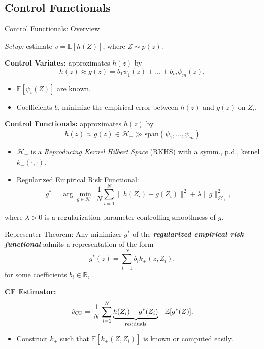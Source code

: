 \documentclass[9pt]{beamer}
\begin{document}
\subsection{Control Functionals}

\begin{frame}[fragile]{Control Functionals: Overview}
\small

\textit{Setup:} estimate $v = \mathbb{E}[h(Z)]$, where $Z \sim p(z)$.

\textbf{Control Variates:} approximates $h(z)$ by
\[
h(z) \approx g(z) = b_1 \psi_1(z) + \dots + b_m \psi_m(z),
\]

\begin{itemize}
\item $\mathbb{E}[\psi_i(Z)]$ are known.
\item Coefficients $b_i$ minimize the empirical error between $h(z)$ and $g(z)$ on $Z_i$.
\end{itemize}

\textbf{Control Functionals\cite{cf}:} approximates $h(z)$ by
$$h(z) \approx g(z) \in \mathcal{H}_+ \gg \text{span}(\psi_1, ..., \psi_m)$$

\begin{itemize}
    \item $\mathcal{H}_+$ is a \emph{Reproducing Kernel Hilbert Space} (RKHS) with a symm., p.d., kernel $k_+(\cdot, \cdot)$.
    \item Regularized Empirical Risk Functional:
    \[
    g^* = \arg \min_{g \in \mathcal{H}_+} \frac{1}{N} \sum_{i=1}^N \|h(Z_i) - g(Z_i)\|^2 + \lambda \|g\|_{\mathcal{H}_+}^2,
    \]
\end{itemize}

where $\lambda > 0$ is a regularization parameter controlling smoothness of $g$.

\end{frame}

\begin{frame}
\small

\begin{alertblock}{Representer Theorem:} Any minimizer $g^*$ of the \textbf{\textit{regularized empirical risk functional}} admits a representation of the form
\[
g^*(z) = \sum_{i=1}^N b_i k_+(z, Z_i),
\]
for some coefficients $b_i \in \mathbb{R}$, \cite{ScholkopfSmola2002}.
\end{alertblock}

\textbf{CF Estimator:} 
\[
\hat{v}_{\rm CF} = \frac{1}{N} \sum_{i=1}^N \underbrace{h(Z_i) - g^*(Z_i)}_{\text{residuals}} + \mathbb{E}[g^*(Z)].
\]

\begin{itemize}
    \item Construct $k_+$ such that $\mathbb{E}[k_+(Z, Z_i)]$ is known or computed easily.
\end{itemize}
\end{frame}
\end{document}

